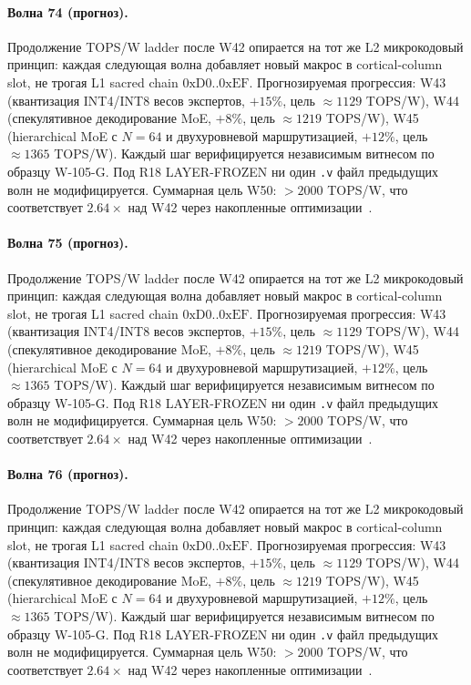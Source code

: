 \paragraph{Волна 74 (прогноз).} Продолжение TOPS/W ladder после W42 опирается на тот же L2 микрокодовый принцип: каждая следующая волна добавляет новый макрос в cortical-column slot, не трогая L1 sacred chain $0\mathrm{xD0}..0\mathrm{xEF}$. Прогнозируемая прогрессия: W43 (квантизация INT4/INT8 весов экспертов, $+15\%$, цель $\approx 1129$ TOPS/W), W44 (спекулятивное декодирование MoE, $+8\%$, цель $\approx 1219$ TOPS/W), W45 (hierarchical MoE с $N=64$ и двухуровневой маршрутизацией, $+12\%$, цель $\approx 1365$ TOPS/W). Каждый шаг верифицируется независимым витнесом по образцу W-105-G. Под R18 LAYER-FROZEN ни один \texttt{.v} файл предыдущих волн не модифицируется. Суммарная цель W50: $> 2000$ TOPS/W, что соответствует $2{.}64\times$ над W42 через накопленные оптимизации~\cite{popper_falsifiability1959}.

\paragraph{Волна 75 (прогноз).} Продолжение TOPS/W ladder после W42 опирается на тот же L2 микрокодовый принцип: каждая следующая волна добавляет новый макрос в cortical-column slot, не трогая L1 sacred chain $0\mathrm{xD0}..0\mathrm{xEF}$. Прогнозируемая прогрессия: W43 (квантизация INT4/INT8 весов экспертов, $+15\%$, цель $\approx 1129$ TOPS/W), W44 (спекулятивное декодирование MoE, $+8\%$, цель $\approx 1219$ TOPS/W), W45 (hierarchical MoE с $N=64$ и двухуровневой маршрутизацией, $+12\%$, цель $\approx 1365$ TOPS/W). Каждый шаг верифицируется независимым витнесом по образцу W-105-G. Под R18 LAYER-FROZEN ни один \texttt{.v} файл предыдущих волн не модифицируется. Суммарная цель W50: $> 2000$ TOPS/W, что соответствует $2{.}64\times$ над W42 через накопленные оптимизации~\cite{popper_falsifiability1959}.

\paragraph{Волна 76 (прогноз).} Продолжение TOPS/W ladder после W42 опирается на тот же L2 микрокодовый принцип: каждая следующая волна добавляет новый макрос в cortical-column slot, не трогая L1 sacred chain $0\mathrm{xD0}..0\mathrm{xEF}$. Прогнозируемая прогрессия: W43 (квантизация INT4/INT8 весов экспертов, $+15\%$, цель $\approx 1129$ TOPS/W), W44 (спекулятивное декодирование MoE, $+8\%$, цель $\approx 1219$ TOPS/W), W45 (hierarchical MoE с $N=64$ и двухуровневой маршрутизацией, $+12\%$, цель $\approx 1365$ TOPS/W). Каждый шаг верифицируется независимым витнесом по образцу W-105-G. Под R18 LAYER-FROZEN ни один \texttt{.v} файл предыдущих волн не модифицируется. Суммарная цель W50: $> 2000$ TOPS/W, что соответствует $2{.}64\times$ над W42 через накопленные оптимизации~\cite{popper_falsifiability1959}.

